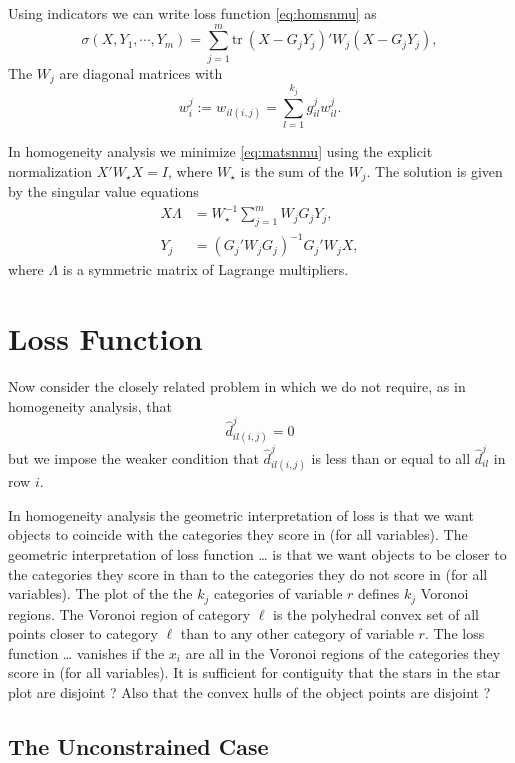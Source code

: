\documentclass[
  12pt,
]{article}
\begin{document}
Using indicators we can write loss function \eqref{eq:homsnmu} as
\begin{equation}
\sigma(X,Y_1,\cdots,Y_m)=
\sum_{j=1}^m\text{tr}\ (X-G_jY_j)'W_j(X-G_jY_j),
\label{eq:matsnmu}
\end{equation}
The \(W_j\) are diagonal matrices with
\begin{equation}
w_i^j:=w_{il(i,j)}=\sum_{l=1}^{k_j}g^j_{il}w^j_{il}.
\label{eq:whomdef}
\end{equation}

In homogeneity analysis we minimize \eqref{eq:matsnmu} using the
explicit normalization \(X'W_\star X=I\), where \(W_\star\) is the
sum of the \(W_j\). The solution is given by the singular value
equations
\begin{align}
X\Lambda&=W_\star^{-1}\sum_{j=1}^m W_jG_jY_j,\label{eq:homsvd1}\\
Y_j&=(G_j'W_jG_j)^{-1}G_j'W_jX,\label{eq:homsvd2}
\end{align}
where \(\Lambda\) is a symmetric matrix of Lagrange multipliers.

\section{Loss Function}\label{loss-function}

Now consider the closely related problem in which we do not require,
as in homogeneity analysis, that
\[
\hat d^j_{il(i,j)}=0
\]
but we impose the weaker condition that \(\hat d^j_{il(i,j)}\) is less than or equal to all \(\hat d^j_{il}\) in row \(i\).

In homogeneity analysis the geometric interpretation of loss is that we
want objects to coincide with the categories they score in (for all variables). The geometric interpretation of loss function \ldots{} is that we want
objects to be closer to the categories they score in than to the categories
they do not score in (for all variables). The plot of the the \(k_j\) categories of
variable \(r\) defines \(k_j\) Voronoi regions. The Voronoi region of
category \(\ell\) is the polyhedral convex set of all points closer to category
\(\ell\) than to any other category of variable \(r\). The loss function
\ldots{} vanishes if the \(x_i\) are all in the Voronoi regions of the categories
they score in (for all variables). It is sufficient for contiguity that the
stars in the star plot are disjoint ? Also that the convex hulls of the
object points are disjoint ?

\subsection{The Unconstrained Case}\label{the-unconstrained-case}
\end{document}
